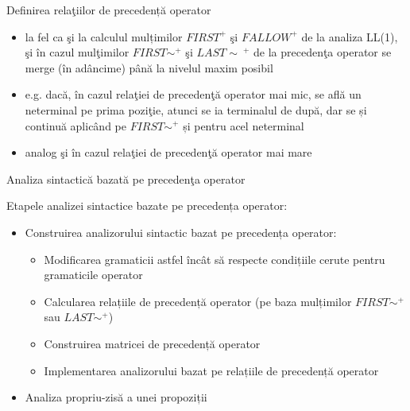 \documentclass[pdf]{beamer}
\begin{document}
\begin{frame}{Definirea relaţiilor de precedență operator}
\begin{itemize}
\item
la fel ca şi la calculul mulțimilor $FIRST^+$ şi $FALLOW^+$ de la analiza LL(1), şi în cazul mulţimilor $FIRST\sim^+$ şi $LAST\sim~^+$ de la precedenţa operator se merge (în adâncime) până la nivelul maxim posibil
\item
e.g. dacă, în cazul relaţiei de precedenţă operator mai mic, se află un neterminal pe prima poziţie, atunci se ia terminalul de după, dar se și continuă aplicând pe $FIRST\sim^+$ și pentru acel neterminal
\item
analog şi în cazul relaţiei de precedenţă operator mai mare
\end{itemize}
\end{frame}



\begin{frame}{Analiza sintactică bazată pe precedenţa operator}

Etapele analizei sintactice bazate pe precedența operator:

\begin{itemize}
\item
Construirea analizorului sintactic bazat pe precedența operator:

\begin{itemize}
\item
Modificarea gramaticii astfel încât să respecte condițiile cerute pentru gramaticile operator
\item
Calcularea relațiile de precedență operator (pe baza mulțimilor $FIRST\sim^+$ sau $LAST\sim^+$) 
\item
Construirea matricei de precedență operator
\item
Implementarea analizorului bazat pe relațiile de precedență operator
\end{itemize}

\item
Analiza propriu-zisă a unei propoziții
\end{itemize}

\end{frame}
\end{document}
